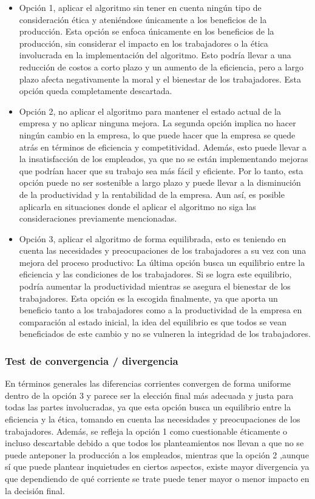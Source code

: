 \begin{itemize}
    \item Opción 1, aplicar el algoritmo sin tener en cuenta ningún tipo de consideración ética y ateniéndose únicamente a los beneficios de la producción. Esta opción se enfoca únicamente en los beneficios de la producción, sin considerar el impacto en los trabajadores o la ética involucrada en la implementación del algoritmo. Esto podría llevar a una reducción de costos a corto plazo y un aumento de la eficiencia, pero a largo plazo afecta negativamente la moral y el bienestar de los trabajadores. Esta opción queda completamente descartada.
    \item Opción 2, no aplicar el algoritmo para mantener el estado actual de la empresa y no aplicar ninguna mejora. La segunda opción implica no hacer ningún cambio en la empresa, lo que puede hacer que la empresa se quede atrás en términos de eficiencia y competitividad. Además, esto puede llevar a la insatisfacción de los empleados, ya que no se están implementando mejoras que podrían hacer que su trabajo sea más fácil y eficiente. Por lo tanto, esta opción puede no ser sostenible a largo plazo y puede llevar a la disminución de la productividad y la rentabilidad de la empresa. Aun así, es posible aplicarla en situaciones donde el aplicar el algoritmo no siga las consideraciones previamente mencionadas.
    \item Opción 3, aplicar el algoritmo de forma equilibrada, esto es teniendo en cuenta las necesidades y preocupaciones de los trabajadores a su vez con una mejora del proceso productivo: La última opción busca un equilibrio entre la eficiencia y las condiciones de los trabajadores. Si se logra este equilibrio, podría aumentar la productividad mientras se asegura el bienestar de los trabajadores. Esta opción es la escogida finalmente, ya que aporta un beneficio tanto a los trabajadores como a la productividad de la empresa en comparación al estado inicial, la idea del equilibrio es que todos se vean beneficiados de este cambio y no se vulneren la integridad de los trabajadores.
\end{itemize}

\subsubsection{Test de convergencia / divergencia}
En términos generales las diferencias corrientes convergen de forma uniforme dentro de la 
opción 3 y parece ser la elección final más adecuada y justa para todas las partes involucradas, 
ya que esta opción busca un equilibrio entre la eficiencia y la ética, tomando en cuenta las 
necesidades y preocupaciones de los trabajadores. Además, se refleja la opción 1 como cuestionable 
éticamente o incluso descartable debido a que todos los planteamientos nos llevan a que no se puede 
anteponer la producción a los empleados, mientras que la opción 2 ,aunque sí que puede plantear 
inquietudes en ciertos aspectos, existe mayor divergencia ya que dependiendo de qué corriente 
se trate puede tener mayor o menor impacto en la decisión final.\medskip

